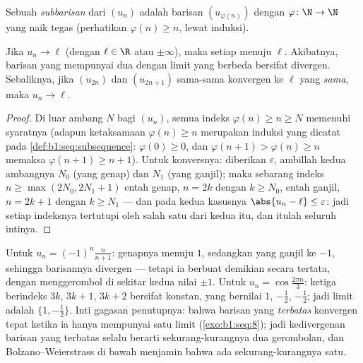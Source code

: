 \begin{definition}[Subbarisan]\label{def:b1:seq:subsequence}
Sebuah \emph{subbarisan} dari $(u_n)$ adalah barisan
$(u_{\varphi(n)})$ dengan $\varphi \colon \N \to \N$ yang naik
tegas (perhatikan $\varphi(n) \geq n$, lewat induksi).
\end{definition}

\begin{proposition}\label{prop:b1:seq:subsequences}
Jika $u_n \to \ell$ (dengan $\ell \in \R$ atau $\pm\infty$), maka setiap 
menuju $\ell$. Akibatnya, barisan yang mempunyai dua  dengan
limit yang berbeda bersifat divergen. Sebaliknya, jika $(u_{2n})$ dan
$(u_{2n+1})$ sama-sama konvergen ke $\ell$ yang \emph{sama}, maka $u_n \to
\ell$.
\end{proposition}

\begin{proof}
Di luar ambang $N$ bagi $(u_n)$, semua indeks $\varphi(n) \geq n
\geq N$ memenuhi syaratnya (adapun ketaksamaan $\varphi(n) \geq n$ merupakan
induksi yang dicatat pada \cref{def:b1:seq:subsequence}: $\varphi(0)
\geq 0$, dan $\varphi(n+1) > \varphi(n) \geq n$ memaksa
$\varphi(n+1) \geq n + 1$). Untuk konversnya: diberikan
$\varepsilon$, ambillah kedua ambangnya $N_0$ (yang genap) dan $N_1$
(yang ganjil); maka sebarang indeks $n \geq \max(2N_0, 2N_1 + 1)$
entah genap, $n = 2k$ dengan $k \geq N_0$, entah ganjil, $n = 2k+1$ dengan
$k \geq N_1$ --- dan pada kedua kasusnya $\abs{u_n - \ell} \leq
\varepsilon$: jadi setiap indeksnya tertutupi oleh salah satu dari kedua
 itu, dan itulah seluruh intinya.
\end{proof}

\begin{example}\label{ex:b1:seq:sublimits}
Untuk $u_n = (-1)^n \frac{n}{n+1}$:  genapnya menuju
$1$, sedangkan yang ganjil ke $-1$, sehingga barisannya divergen --- tetapi ia
berbuat demikian secara tertata, dengan menggerombol di sekitar kedua nilai $\pm 1$.
Untuk $u_n = \cos\frac{2\pi n}{3}$: ketiga 
berindeks $3k$, $3k + 1$, $3k + 2$ bersifat konstan, yang bernilai $1$,
$-\frac12$, $-\frac12$; jadi  limit  adalah $\{1,
-\frac12\}$. Inti gagasan penutupnya: bahwa barisan yang \emph{terbatas}
konvergen tepat ketika ia hanya mempunyai satu limit 
(\cref{exo:b1:seq:8}); jadi kedivergenan barisan yang terbatas selalu
berarti sekurang-kurangnya dua gerombolan, dan Bolzano--Weierstrass di bawah
menjamin bahwa ada sekurang-kurangnya satu.
\end{example}

